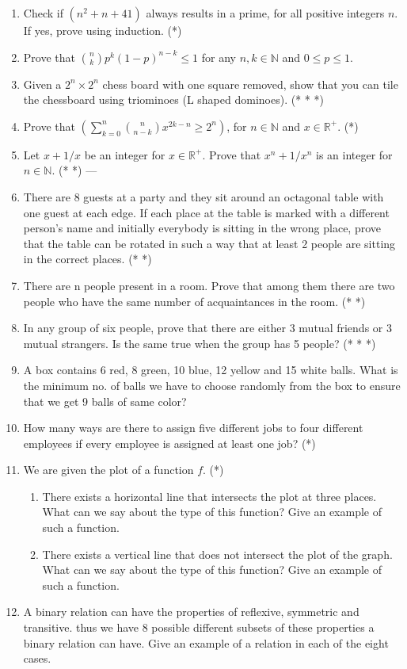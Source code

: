 \documentclass[a4paper]{article}
\begin{document}
\begin{enumerate}
\item Check if $(n^2 +n+41)$ always results in a prime, for all positive integers $n$. If yes, prove using induction. (*)

\item Prove that ${n \choose k} {p^k}(1-p)^{n-k} \leq 1$ for any $n,k \in \mathbb{N}$ and $0 \leq p \leq 1$.

\item Given a $2^n \times 2^n$ chess board with one square removed, show that you can tile the chessboard using triominoes (L shaped dominoes). (* * *)

\item Prove that $\left( \sum_{k=0}^{n} {n \choose {n-k}} x^{2k-n} \geq 2^n \right)$, for $n \in \mathbb{N}$ and $x \in \mathbb{R}^+$. (*)

\item Let $x+ 1/x$ be an integer for $x \in \mathbb{R}^+$. Prove that $x^n+ 1/x^n$ is an integer for $n \in \mathbb{N}$. (* *)
---
\item There are 8 guests at a party and they sit around an octagonal table with one guest at each edge. If each place at the table is marked with a different person’s name and initially everybody is sitting in the wrong place, prove that the table can be rotated in such a way that at least 2 people are sitting in the correct places. (* *)

\item There are n people present in a room. Prove that among them there are two people who have the same number of acquaintances in the room. (* *)

\item In any group of six people, prove that there are either 3 mutual friends or 3 mutual strangers. Is the same true when the group has 5 people? (* * *)

\item A box contains 6 red, 8 green, 10 blue, 12 yellow and 15 white balls. What is the minimum no. of balls we have to choose randomly from the box to ensure that we get 9 balls of same color?

\item How many ways are there to assign five different jobs to four different employees if every employee is assigned at least one job? (*)

\item We are given the plot of a function $f$.  (*)
\begin{enumerate}
\item There exists a horizontal line that intersects the plot at three places. What can we say about the type of this function? Give an example of such a function.
\item There exists a vertical line that does not intersect the plot of the graph. What can we say about the type of this function? Give an example of such a function.
\end{enumerate}
\item A binary relation can have the properties of reflexive, symmetric and transitive. thus we have 8 possible different subsets of these properties a binary relation can have. Give
an example of a relation in each of the eight cases.


\end{enumerate}
\end{document}
